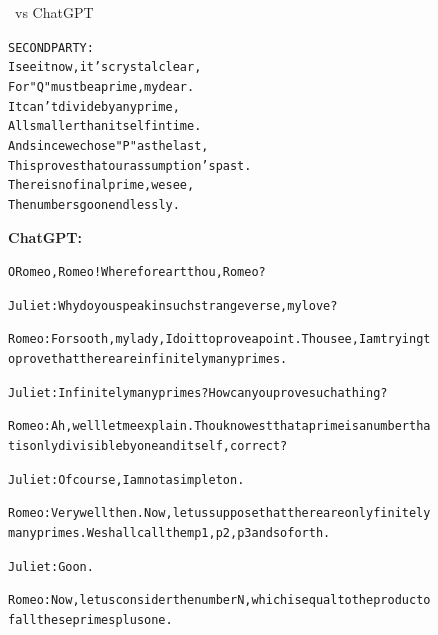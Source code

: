 \begin{figure}[H]
\begin{AIbox}{\DV \ vs ChatGPT}
{\begin{alltt}
SECOND PARTY:\\
I see it now, it's crystal clear,\\
For "Q" must be a prime, my dear.\\
It can't divide by any prime,\\
All smaller than itself in time.\\
And since we chose "P" as the last,\\
This proves that our assumption's past.\\
There is no final prime, we see,\\
The numbers go on endlessly.\end{alltt}}
\parbox[t]{0.6\textwidth}{{\bf ChatGPT:} \scriptsize \begin{alltt}
O Romeo, Romeo! Wherefore art thou, Romeo?\\\vspace{-3px}

Juliet: Why do you speak in such strange verse, my love?\\\vspace{-3px}

Romeo: Forsooth, my lady, I do it to prove a point. Thou see, I am trying to prove that there are infinitely many primes.\\\vspace{-3px}

Juliet: Infinitely many primes? How can you prove such a thing?\\\vspace{-3px}

Romeo: Ah, well let me explain. Thou knowest that a prime is a number that is only divisible by one and itself, correct?\\\vspace{-3px}

Juliet: Of course, I am not a simpleton.\\\vspace{-3px}

Romeo: Very well then. Now, let us suppose that there are only finitely many primes. We shall call them p1, p2, p3 and so forth.\\\vspace{-3px}

Juliet: Go on.\\\vspace{-3px}

Romeo: Now, let us consider the number N, which is equal to the product of all these primes plus one.\\\vspace{-3px}


\end{alltt}}
\end{AIbox}
\end{figure}
